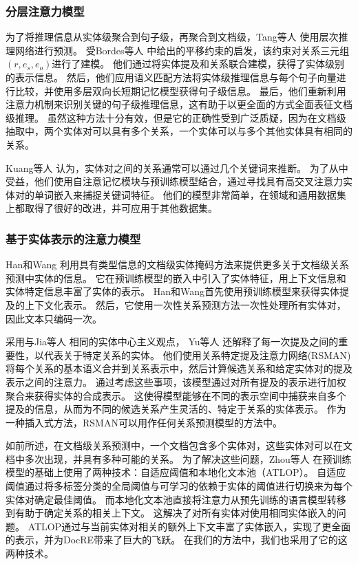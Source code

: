 \documentclass[bachelor]{thesis-uestc}
\begin{document}
\subsubsection{分层注意力模型}
为了将推理信息从实体级聚合到句子级，再聚合到文档级，Tang等人 \cite{Tang2020HINHI}使用层次推理网络进行预测。
受Bordes等人 \cite{NIPS2013_1cecc7a7} 中给出的平移约束的启发，该约束对关系三元组$( r, e_s, e_o )$进行了建模。
他们通过将实体提及和关系联合建模，获得了实体级别的表示信息。
然后，他们应用语义匹配方法将实体级推理信息与每个句子向量进行比较，并使用多层双向长短期记忆模型获得句子级信息。
最后，他们重新利用注意力机制来识别关键的句子级推理信息，这有助于以更全面的方式全面表征文档级推理。
虽然这种方法十分有效，但是它的正确性受到广泛质疑，因为在文档级抽取中，两个实体对可以具有多个关系，一个实体可以与多个其他实体具有相同的关系。\par

Kuang等人 \cite{app12031599} 认为，实体对之间的关系通常可以通过几个关键词来推断。
为了从中受益，他们使用自注意记忆模块与预训练模型结合，通过寻找具有高交叉注意力实体对的单词嵌入来捕捉关键词特征。
他们的模型非常简单，在领域和通用数据集上都取得了很好的改进，并可应用于其他数据集。

\subsubsection{基于实体表示的注意力模型}\label{subsec:entity-based-attention}

Han和Wang \cite{9098945}利用具有类型信息的文档级实体掩码方法来提供更多关于文档级关系预测中实体的信息。
它在预训练模型的嵌入中引入了实体特征，用上下文信息和实体特定信息丰富了实体的表示。
Han和Wang首先使用预训练模型来获得实体提及的上下文化表示。
然后，它使用一次性关系预测方法一次性处理所有实体对，因此文本只编码一次。\par

采用与Jia等人 \cite{jia-etal-2019-document}相同的实体中心主义观点， Yu等人 \cite{yu-etal-2022-relation} 还解释了每一次提及之间的重要性，以代表关于特定关系的实体。
他们使用关系特定提及注意力网络(RSMAN)将每个关系的基本语义合并到关系表示中，然后计算候选关系和给定实体对的提及表示之间的注意力。
通过考虑这些事项，该模型通过对所有提及的表示进行加权聚合来获得实体的合成表示。
这使得模型能够在不同的表示空间中捕获来自多个提及的信息，从而为不同的候选关系产生灵活的、特定于关系的实体表示。
作为一种插入式方法，RSMAN可以用作任何关系预测模型的方法中。\par

如前所述，在文档级关系预测中，一个文档包含多个实体对，这些实体对可以在文档中多次出现，并具有多种可能的关系。
为了解决这些问题，Zhou等人 \cite{Zhao2022DocumentlevelRE}在预训练模型的基础上使用了两种技术：自适应阈值和本地化文本池（ATLOP）。
自适应阈值通过将多标签分类的全局阈值与可学习的依赖于实体的阈值进行切换来为每个实体对确定最佳阈值。
而本地化文本池直接将注意力从预先训练的语言模型转移到有助于确定关系的相关上下文。
这解决了对所有实体对使用相同实体嵌入的问题。
ATLOP通过与当前实体对相关的额外上下文丰富了实体嵌入，实现了更全面的表示，并为DocRE带来了巨大的飞跃。
在我们的方法中，我们也采用了它的这两种技术。\par
\end{document}
